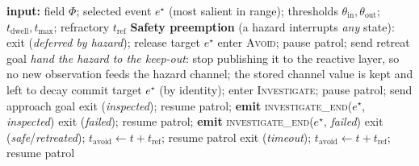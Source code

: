 \begin{algorithm}[t]
\caption{\textsc{Stay Alert} reactive layer (per control tick)}
\label{alg:stayalert}
\begin{algorithmic}[1]
\STATE \textbf{input:} field $\Phi$; selected event $e^\star$ (most salient in
       range); thresholds $\theta_{\text{in}},\theta_{\text{out}}$;
       $t_{\text{dwell}}, t_{\max}$; refractory $t_{\text{ref}}$
\STATE \textbf{Safety preemption} (a hazard interrupts \emph{any} state):
     \STATE exit (\emph{deferred by hazard}); release target $e^\star$
  \ENDIF
  \STATE enter \textsc{Avoid}; pause patrol; send retreat goal
     \STATE \emph{hand the hazard to the keep-out}: stop publishing it to the
            reactive layer, so no new observation feeds the hazard channel; the
            stored channel value is kept and left to decay
  \ENDIF
{}
     \STATE commit target $e^\star$ (by identity); enter \textsc{Investigate};
            pause patrol; send approach goal
  \ENDIF
{}
     \STATE exit (\emph{inspected}); resume patrol;
            \textbf{emit} \textsc{investigate\_end}($e^\star$, \emph{inspected})
     \STATE exit (\emph{failed}); resume patrol;
            \textbf{emit} \textsc{investigate\_end}($e^\star$, \emph{failed})
  \ENDIF
{}
     \STATE exit (\emph{safe}/\emph{retreated});
            $t_{\text{avoid}} \gets t + t_{\text{ref}}$; resume patrol
     \STATE exit (\emph{timeout});
            $t_{\text{avoid}} \gets t + t_{\text{ref}}$; resume patrol
  \ENDIF
\ENDIF
\end{algorithmic}
\end{algorithm}

